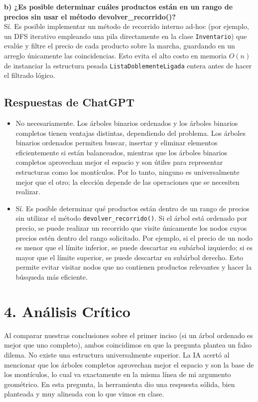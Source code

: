 \documentclass[12pt, letterpaper]{article}
\begin{document}
\textbf{b) ¿Es posible determinar cuáles productos están en un rango de precios sin usar el método devolver\_recorrido()?} \\
Sí. Es posible implementar un método de recorrido interno ad-hoc (por ejemplo, un DFS iterativo empleando una pila directamente en la clase \texttt{Inventario}) que evalúe y filtre el precio de cada producto sobre la marcha, guardando en un arreglo únicamente las coincidencias. Esto evita el alto costo en memoria $O(n)$ de instanciar la estructura pesada \texttt{ListaDoblementeLigada} entera antes de hacer el filtrado lógico.

\subsection*{Respuestas de ChatGPT}
\begin{itemize}
    \item[a)] No necesariamente. Los árboles binarios ordenados y los árboles binarios completos tienen ventajas distintas, dependiendo del problema. Los árboles binarios ordenados permiten buscar, insertar y eliminar elementos eficientemente si están balanceados, mientras que los árboles binarios completos aprovechan mejor el espacio y son útiles para representar estructuras como los montículos. Por lo tanto, ninguno es universalmente mejor que el otro; la elección depende de las operaciones que se necesiten realizar.

    \item[b)] Sí. Es posible determinar qué productos están dentro de un rango de precios sin utilizar el método \texttt{devolver\_recorrido()}. Si el árbol está ordenado por precio, se puede realizar un recorrido que visite únicamente los nodos cuyos precios estén dentro del rango solicitado. Por ejemplo, si el precio de un nodo es menor que el límite inferior, se puede descartar su subárbol izquierdo; si es mayor que el límite superior, se puede descartar su subárbol derecho. Esto permite evitar visitar nodos que no contienen productos relevantes y hacer la búsqueda más eficiente.
\end{itemize}

\section*{4. Análisis Crítico}

Al comparar nuestras conclusiones sobre el primer inciso (si un árbol ordenado es mejor que uno completo), ambos coincidimos en que la pregunta plantea un falso dilema. No existe una estructura universalmente superior. La IA acertó al mencionar que los árboles completos aprovechan mejor el espacio y son la base de los montículos, lo cual va exactamente en la misma línea de mi argumento geométrico. En esta pregunta, la herramienta dio una respuesta sólida, bien planteada y muy alineada con lo que vimos en clase.
\end{document}

